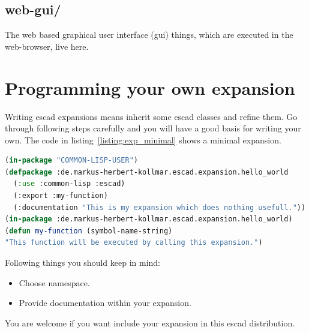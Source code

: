 \documentclass[a4paper, 12pt, openany]{scrbook}
\begin{document}
\subsection{web-gui/}
The web based graphical user interface (gui) things, which are executed in the web-browser, live here.
\section{Programming your own expansion}
Writing escad expansions means inherit some escad classes and refine them. Go through following steps carefully and you will have a good basis for writing your own. The code in listing~\ref{listing:exp_minimal} shows a minimal expansion.
\begin{lstlisting}[caption={Minimal expansion code.}, language=Lisp, morekeywords={in-package, use}, label=listing:exp_minimal]
(in-package "COMMON-LISP-USER")
(defpackage :de.markus-herbert-kollmar.escad.expansion.hello_world
  (:use :common-lisp :escad)
  (:export :my-function)
  (:documentation "This is my expansion which does nothing usefull."))
(in-package :de.markus-herbert-kollmar.escad.expansion.hello_world)
(defun my-function (symbol-name-string)
"This function will be executed by calling this expansion.")
\end{lstlisting}
Following things you should keep in mind:
\begin{itemize}
\item Choose namespace.
\item Provide documentation within your expansion.
\end{itemize}
You are welcome if you want include your expansion in this escad distribution.
\end{document}

